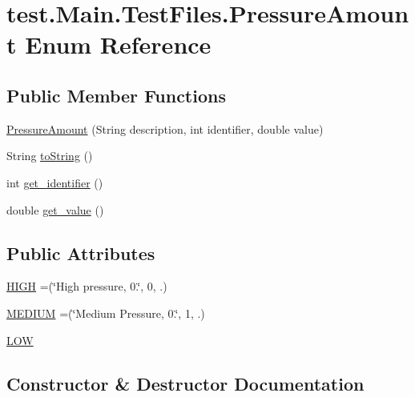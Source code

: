 \hypertarget{enumtest_1_1_main_1_1_test_files_1_1_pressure_amount}{}\section{test.\+Main.\+Test\+Files.\+Pressure\+Amount Enum Reference}
\label{enumtest_1_1_main_1_1_test_files_1_1_pressure_amount}
\subsection*{Public Member Functions}
\begin{DoxyCompactItemize}
\item 
\hyperlink{enumtest_1_1_main_1_1_test_files_1_1_pressure_amount_a3bc5a52a8ba8bd7e723bbdf524672511}{Pressure\+Amount} (String description, int identifier, double value)
\item 
String \hyperlink{enumtest_1_1_main_1_1_test_files_1_1_pressure_amount_aea6994ed3f8f7494b72b595a928dd648}{to\+String} ()
\item 
int \hyperlink{enumtest_1_1_main_1_1_test_files_1_1_pressure_amount_adc88b56b134392844a20f9a8fcd73e53}{get\+\_\+identifier} ()
\item 
double \hyperlink{enumtest_1_1_main_1_1_test_files_1_1_pressure_amount_adafeeee7e8e63f9169a03a8555ec685c}{get\+\_\+value} ()
\end{DoxyCompactItemize}
\subsection*{Public Attributes}
\begin{DoxyCompactItemize}
\item 
\hyperlink{enumtest_1_1_main_1_1_test_files_1_1_pressure_amount_a321472c250b974ef4f419acf92300eeb}{H\+I\+GH} =(\char`\"{}High pressure, 0.\char`\"{}, 0, .)
\item 
\hyperlink{enumtest_1_1_main_1_1_test_files_1_1_pressure_amount_a42949a0c635d96edf5eedd231e539e2c}{M\+E\+D\+I\+UM} =(\char`\"{}Medium Pressure, 0.\char`\"{}, 1, .)
\item 
\hyperlink{enumtest_1_1_main_1_1_test_files_1_1_pressure_amount_a7e4af3a5f4b0df871b174b6154903545}{L\+OW}
\end{DoxyCompactItemize}


\subsection{Constructor \& Destructor Documentation}
